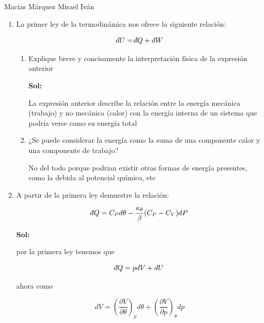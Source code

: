 \documentclass[12pt,a4paper]{article}
\newcommand{\dbar}{\mathchar'26\mkern-12mu d}
\begin{document}
Macías Márquez Misael Iván

\begin{enumerate}






    \item La primer ley de la termodinámica nos ofrece la siguiente relación:
    
    \begin{equation*}
        dU = \dbar Q + dW
    \end{equation*}
    
    \begin{enumerate}
        \item  Explique breve y concisamente la interpretación física de la expresión anterior
        
        \textbf{Sol:}
        
        La expresión anterior describe la relación entre la energía mecánica (trabajo) y no mecánica (calor) con la energía interna de un sistema que podría verse como su energía total 
        
        \item ¿Se puede considerar la energía como la suma de una componente calor y una componente de trabajo?
        
        No del todo porque podrian existir otras formas de energía presentes, como la debida al potencial químico, etc
    \end{enumerate}
    
    
    
    
    
    
    \item A partir de la primera ley demuestre la relación:
    
    \begin{equation*}
        \dbar Q = C_P d\theta - \frac{\kappa_\theta}{\beta}(C_P - C_V) dP
    \end{equation*}
    
    \textbf{Sol:}
    
    por la primera ley tenemos que 
    
    \begin{equation}
        \dbar Q =  p dV + dU
    \end{equation}
    
    ahora como
    
    \begin{equation*}
        dV = \left(\frac{\partial V}{\partial \theta}\right)_p d\theta + \left(\frac{\partial V}{\partial p}\right)_\theta dp
    \end{equation*}
    

\end{enumerate}
\end{document}
